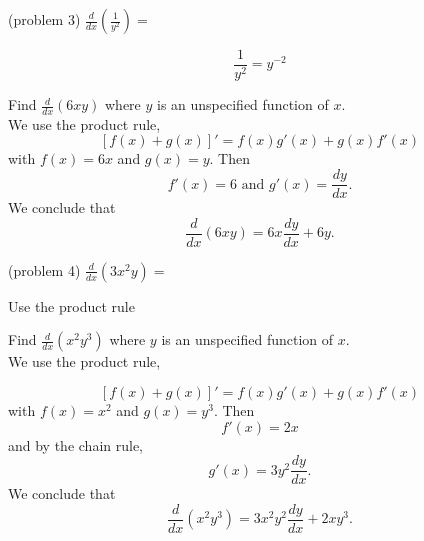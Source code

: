 \documentclass[handout]{ximera}
\begin{document}
\begin{problem}(problem 3)
  $\displaystyle{\frac{d}{dx} \left(\frac{1}{y^2}\right)=}$
 
\begin{multipleChoice}
\end{multipleChoice}
	  \begin{hint}
      \[\frac{1}{y^2} = y^{-2}\]
    \end{hint}
	
\end{problem}


\begin{example}[example 4]
Find $\frac{d}{dx} (6xy)$ where $y$ is an unspecified function of $x$.\\
We use the product rule,
\[\displaystyle{[f(x) + g(x)]' = f(x)g'(x) + g(x)f'(x)}\]
with $f(x) = 6x$ and $g(x) = y$. Then 
\[f'(x) = 6 \text{ and } g'(x) = \frac{dy}{dx}.\]
We conclude that
\[\frac{d}{dx} (6xy) = 6x \frac{dy}{dx} + 6y.\]
\end{example}



\begin{center}
\begin{foldable}
\end{foldable}
\end{center}


\begin{problem}(problem 4)
  $\displaystyle{\frac{d}{dx} \left(3x^2y\right)=}$
 
\begin{multipleChoice}
\end{multipleChoice}
	     
		\begin{hint}
      Use the product rule
    \end{hint}
 	
\end{problem}


\begin{example}[example 5]
Find $\frac{d}{dx} (x^2y^3)$ where $y$ is an unspecified function of $x$.\\
We use the product rule,

\[
[f(x) + g(x)]' = f(x)g'(x) + g(x)f'(x)
\]
with $f(x) = x^2$ and $g(x) = y^3$. Then 
\[f'(x) = 2x \]
and by the chain rule,
\[
g'(x) = 3y^2\frac{dy}{dx}.
\]
We conclude that
\[
\frac{d}{dx} (x^2y^3) = 3x^2y^2\frac{dy}{dx} + 2xy^3.
\]
\end{example}
\end{document}
